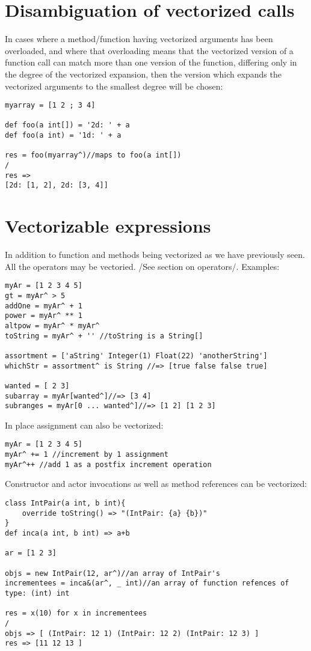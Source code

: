 \documentclass[conc-doc]{subfiles}
\begin{document}
\section{Disambiguation of vectorized calls}
In cases where a method/function having vectorized arguments has been overloaded, and where that overloading means that the vectorized version of a function call can match more than one version of the function, differing only in the degree of the vectorized expansion, then the version which expands the vectorized arguments to the smallest degree will be chosen:
\begin{lstlisting}
myarray = [1 2 ; 3 4]

def foo(a int[]) = '2d: ' + a
def foo(a int) = '1d: ' + a

res = foo(myarray^)//maps to foo(a int[])
/
res =>
[2d: [1, 2], 2d: [3, 4]]
\end{lstlisting}

\section{Vectorizable expressions}
In addition to function and methods being vectorized as we have previously seen. All the operators may be vectoried. /See section on operators/. Examples:
\begin{lstlisting}
myAr = [1 2 3 4 5]
gt = myAr^ > 5
addOne = myAr^ + 1
power = myAr^ ** 1
altpow = myAr^ * myAr^
toString = myAr^ + '' //toString is a String[]

assortment = ['aString' Integer(1) Float(22) 'anotherString']
whichStr = assortment^ is String //=> [true false false true]

wanted = [ 2 3]
subarray = myAr[wanted^]//=> [3 4]
subranges = myAr[0 ... wanted^]//=> [1 2] [1 2 3]
\end{lstlisting}

In place assignment can also be vectorized:
\begin{lstlisting}
myAr = [1 2 3 4 5]
myAr^ += 1 //increment by 1 assignment
myAr^++ //add 1 as a postfix increment operation
\end{lstlisting}

Constructor and actor invocations as well as method references can be vectorized:
\begin{lstlisting}
class IntPair(a int, b int){
	override toString() => "(IntPair: {a} {b})"
}
def inca(a int, b int) => a+b

ar = [1 2 3]

objs = new IntPair(12, ar^)//an array of IntPair's
incrementees = inca&(ar^, _ int)//an array of function refences of type: (int) int

res = x(10) for x in incrementees
/
objs => [ (IntPair: 12 1) (IntPair: 12 2) (IntPair: 12 3) ]
res => [11 12 13 ]
\end{lstlisting}
\end{document}
